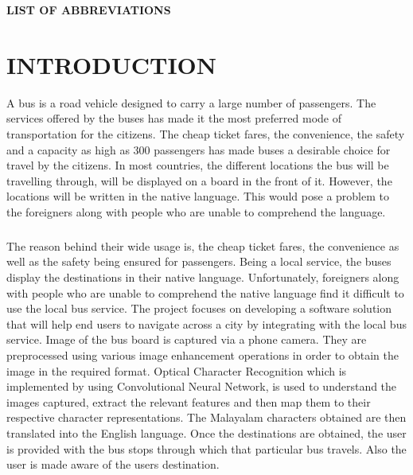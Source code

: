 \documentclass[a4paper,12pt]{report}
\begin{document}
\setcounter{page}{1}
\setcounter{tocdepth}{1}
\renewcommand\contentsname{CONTENTS}
\tableofcontents

\newpage
\vspace*{2.52cm} \hspace*{-0.88cm}
\hspace*{4.3cm}
\textbf{{\large LIST OF ABBREVIATIONS}}\\
\vspace*{0.5cm}
\begin{acronym}[AWGN]
     
\end{acronym}

\newpage
{}
\renewcommand\listfigurename{LIST OF FIGURES}
\listoffigures

\newpage
{}
\setcounter{page}{1}
\renewcommand\chaptername{CHAPTER}
\chapter{INTRODUCTION}
A bus  is a road vehicle designed to carry a large number of passengers. The services offered by the buses has made it the most preferred mode of transportation for the citizens. The cheap ticket fares, the convenience, the safety and a capacity as high as 300 passengers  has made buses a desirable choice for travel by the citizens. In most countries, the different locations the bus will be travelling through, will be displayed on a board in the front of it. However, the locations will be written in the native language. This would pose a problem to the foreigners along with people who are unable to comprehend the language. 

\paragraph{}
The reason behind their wide usage is, the cheap ticket fares, the
convenience as well as the safety being ensured for passengers. Being a
local service, the buses display the destinations in their native language.
Unfortunately, foreigners along with people who are unable to comprehend
the native language find it difficult to use the local bus service.
The project focuses on developing a software solution that will help end
users to navigate across a city by integrating with the local bus service.
Image of the bus board is captured via a phone camera. They are
preprocessed using various image enhancement operations in order to
obtain the image in the required format. Optical Character Recognition
which is implemented by using Convolutional Neural Network, is used to
understand the images captured, extract the relevant features and then
map them to their respective character representations. The Malayalam
characters obtained are then translated into the English language. Once the
destinations are obtained, the user is provided with the bus stops through
which that particular bus travels. Also the user is made aware of the users
destination.
\end{document}
